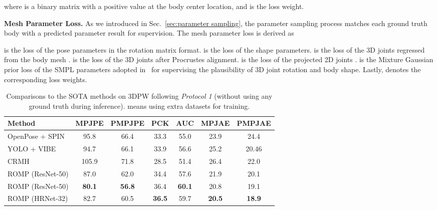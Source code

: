 \documentclass[10pt,twocolumn,letterpaper]{article}
\begin{document}
where   is a binary matrix with a positive value at the body center location, and  is the loss weight.

\textbf{Mesh Parameter Loss.} 
As we introduced in Sec.~\ref{sec:parameter sampling}, the parameter sampling process matches each ground truth body with a predicted parameter result for supervision.
The mesh parameter loss is derived as 

 is the  loss of the pose parameters in the  rotation matrix format. 
 is the  loss of the shape parameters. 
 is the  loss of the 3D joints  regressed from the body mesh .
 is the  loss of the 3D joints  after Procrustes alignment.
 is the  loss of the projected 2D joints . 
 is the Mixture Gaussian prior loss of the SMPL parameters adopted in~\cite{keep,SMPL} for supervising the plausibility of 3D joint rotation and body shape. Lastly,  denotes the corresponding loss weights.


\begin{table*}[t]
\setlength\tabcolsep{2pt}
  \centering
  \caption{{Comparisons to the SOTA methods  on 3DPW following \textit{Protocol 1} (without using any ground truth during inference).  means using extra datasets for training.}}  \label{tab:3DPW}{
    \begin{tabular}{l|cccccc}
    \hline
    \textbf{Method} & \textbf{MPJPE} &  \textbf{PMPJPE} &\textbf{PCK} &	\textbf{AUC} &\textbf{MPJAE} & \textbf{PMPJAE} \\
    \hline
        OpenPose + SPIN~\cite{kolotouros2019spin}&  95.8 &  66.4 &33.3 & 55.0  & 23.9 & 24.4\\
        YOLO + VIBE~\cite{kocabas2020vibe}& 94.7 & 66.1 & 33.9 & 56.6 &25.2 &20.46 \\
        CRMH~\cite{jiang2020coherent}& 105.9 &71.8 &   28.5 & 51.4 & 26.4 & 22.0\\
        \hline
        ROMP (ResNet-50) & 87.0 & 62.0 & 34.4 & 57.6 & 21.9 & 20.1\\
        ROMP (ResNet-50) & \textbf{80.1} &  \textbf{56.8} &36.4 & \textbf{60.1} & 20.8 &19.1\\
        ROMP (HRNet-32) &82.7 & 60.5 &  \textbf{36.5} & 59.7 & \textbf{20.5} & \textbf{18.9}\\
    \hline
    \end{tabular} } \vspace{-0.3cm}
\end{table*}
\end{document}

